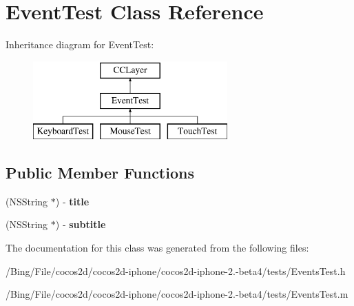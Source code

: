 \hypertarget{interface_event_test}{\section{Event\-Test Class Reference}
\label{interface_event_test}
}
Inheritance diagram for Event\-Test\-:\begin{figure}[H]
\begin{center}
\leavevmode
\includegraphics[height=3.000000cm]{interface_event_test}
\end{center}
\end{figure}
\subsection*{Public Member Functions}
\begin{DoxyCompactItemize}
\item 
\hypertarget{interface_event_test_abe3fa6c3725fc5e086887e7177cf7d16}{(N\-S\-String $\ast$) -\/ {\bfseries title}}\label{interface_event_test_abe3fa6c3725fc5e086887e7177cf7d16}

\item 
\hypertarget{interface_event_test_aa0d5b225d336f65651ba3ae41dcf3f7e}{(N\-S\-String $\ast$) -\/ {\bfseries subtitle}}\label{interface_event_test_aa0d5b225d336f65651ba3ae41dcf3f7e}

\end{DoxyCompactItemize}


The documentation for this class was generated from the following files\-:\begin{DoxyCompactItemize}
\item 
/\-Bing/\-File/cocos2d/cocos2d-\/iphone/cocos2d-\/iphone-\/2.-\/beta4/tests/Events\-Test.\-h\item 
/\-Bing/\-File/cocos2d/cocos2d-\/iphone/cocos2d-\/iphone-\/2.-\/beta4/tests/Events\-Test.\-m\end{DoxyCompactItemize}
